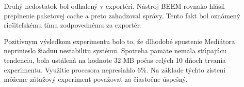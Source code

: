 Druhý nedostatok bol odhalený v exportéri. Nástroj BEEM rovnako hlásil preplnenie paketovej cache a 
preto zahadzoval správy. Tento fakt bol oznámený riešiteľskému tímu zodpovednému za exportér.

Pozitívnym výsledkom experimentu bolo to, že dlhodobé spustenie Mediátora neprinieslo žiadnu nestabilitu 
systému. Spotreba pamäte nemala stúpajúcu tendenciu, bola ustálená na hodnote 32 MB počas celých 
10 dňoch trvania experimentu. Využitie procesora nepresiahlo 6\%. Na základe týchto zistení môžeme záťažový 
experiment považovať za čiastočne úspešný.




























